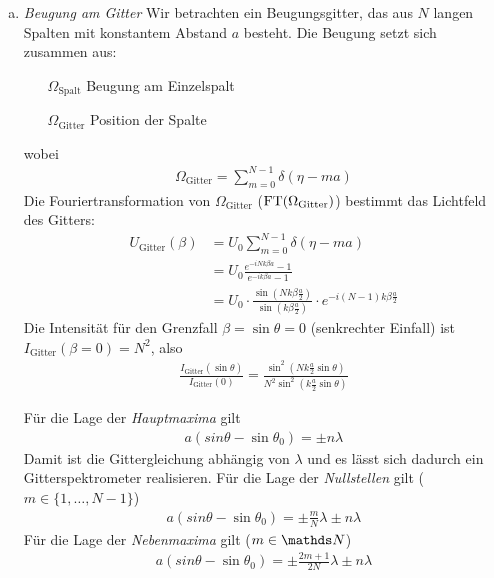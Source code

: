 \begin{enumerate}[a)]
\item \emph{Beugung am Gitter}
Wir betrachten ein Beugungsgitter, das aus $N$ langen Spalten mit
konstantem Abstand $a$ besteht.
Die Beugung setzt sich zusammen aus:
\begin{itemize}
\item[$\Omega_\text{Spalt}$] Beugung am Einzelspalt
\item[$\Omega_\text{Gitter}$] Position der Spalte
\end{itemize}
wobei
\begin{align*}
  \Omega_\text{Gitter} = \sum_{m=0}^{N-1}\delta(\eta-ma)
\end{align*}
Die Fouriertransformation von $\Omega_\text{Gitter}$
($\operatorname{FT}(\Omega_\text{Gitter})$) bestimmt das Lichtfeld des Gitters:
\begin{align*}
  U_\text{Gitter}(\beta) 
  &= U_0 \sum_{m=0}^{N-1} \delta(\eta-ma)\\
  &= U_0 \frac
    {e^{-iNk\beta a} - 1}
    {e^{-i k\beta a} - 1} \\
  &= U_0 \cdot \frac
    { \sin\left( Nk\beta\frac{a}{2} \right) }
    { \sin\left(  k\beta\frac{a}{2} \right) }
    \cdot e^{-i(N-1)k\beta\frac{a}{2}}
\end{align*}
Die Intensität für den Grenzfall $\beta=\sin\theta=0$ (senkrechter
Einfall) ist
$I_\text{Gitter}(\beta=0) = N^2$, also
\begin{gather*}
  \frac{ I_\text{Gitter}(\sin\theta) }{ I_\text{Gitter}(0)}
  = \frac
  {    \sin^2\left( Nk\frac{a}{2} \sin\theta \right) }
  { N^2\sin^2\left(  k\frac{a}{2} \sin\theta \right) }
\end{gather*}

Für die Lage der \emph{Hauptmaxima} gilt
\begin{gather*}
  a(sin\theta-\sin\theta_0) = \pm n\lambda
\end{gather*}
Damit ist die Gittergleichung abhängig von $\lambda$ und es lässt sich
dadurch ein Gitterspektrometer realisieren.
Für die Lage der \emph{Nullstellen} gilt ($m\in\{1,\dotsc,N-1\}$)
\begin{gather*}
  a(sin\theta-\sin\theta_0) = \pm \frac{m}{N}\lambda \pm n\lambda
\end{gather*}
Für die Lage der \emph{Nebenmaxima} gilt ($m\in\N$)
\begin{gather*}
  a(sin\theta-\sin\theta_0) = \pm \frac{2m+1}{2N}\lambda \pm n\lambda
\end{gather*}


\end{enumerate}
